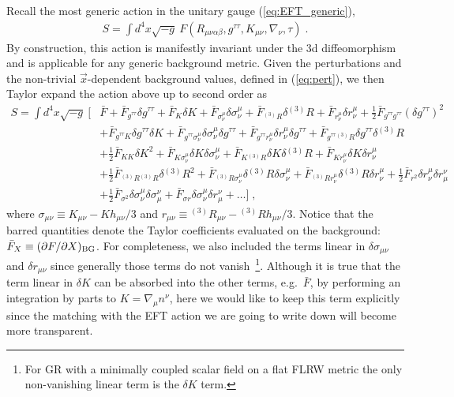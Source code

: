 \documentclass[a4paper,11pt]{article}
\numberwithin{equation}{section}
\begin{document}
Recall the most generic action in the unitary gauge (\ref{eq:EFT_generic}),
\begin{align}
S = \int d^4x \sqrt{-g}~F(R_{\mu\nu\alpha\beta},g^{\tau\tau},K_{\mu\nu},\nabla_\nu,\tau) \;.
\end{align}
By construction, this action is manifestly invariant under the 3d diffeomorphism and is applicable for any generic background metric. Given the perturbations and the non-trivial $\vec{x}$-dependent background values, defined in (\ref{eq:pert}), we then Taylor expand the action above up to second order as
\begin{align}\label{eq:EFT_taylor}
S = \int d^4x \sqrt{-g}~\bigg[&\bar{F} + \bar{F}_{g^{\tau\tau}} \delta g^{\tau\tau} + \bar{F}_{K}\delta K + \bar{F}_{\sigma^\mu_\nu}\delta \sigma^\mu_\nu + \bar{F}_{{}^{(3)}\!R}\delta {}^{(3)}\!R +  \bar{F}_{r^\mu_\nu}\delta r^\mu_\nu + \frac{1}{2}\bar{F}_{g^{\tau\tau}g^{\tau\tau}}(\delta g^{\tau\tau})^2 \nonumber \\  & + \bar{F}_{g^{\tau\tau}K} \delta g^{\tau\tau}\delta K + \bar{F}_{g^{\tau\tau} \sigma^\mu_\nu}\delta \sigma^\mu_\nu \delta g^{\tau\tau}  + \bar{F}_{g^{\tau\tau} r^\mu_\nu}\delta r^\mu_\nu \delta g^{\tau\tau} + \bar{F}_{g^{\tau\tau}{}^{(3)}\!R}\delta g^{\tau\tau} \delta {}^{(3)}\!R  \nonumber \\
&   + \frac{1}{2}\bar{F}_{KK} \delta K^2 + \bar{F}_{K \sigma^\mu_\nu}\delta K \delta \sigma^\mu_\nu + \bar{F}_{K{}^{(3)}\!R}\delta K \delta {}^{(3)}\!R + \bar{F}_{K r^\mu_\nu}\delta K \delta r^\mu_\nu    \nonumber \\ 
&  + \frac{1}{2} \bar{F}_{{}^{(3)}\!R{}^{(3)}\!R}\delta {}^{(3)}\!R^2   + \bar{F}_{{}^{(3)}\!R \sigma^\mu_\nu} \delta {}^{(3)}\!R \delta \sigma^\mu_\nu  +   \bar{F}_{{}^{(3)}\!R r^\mu_\nu}\delta {}^{(3)}\!R \delta r^\mu_\nu+\frac{1}{2}\bar{F}_{r^2 }\delta r^\mu_\nu \delta r^\nu_\mu   \nonumber \\
& + \frac{1}{2}\bar{F}_{\sigma^2} \delta \sigma^\mu_\nu \delta \sigma^\nu_\mu + \bar{F}_{\sigma r }\delta \sigma^\mu_\nu \delta r^\nu_\mu + \ldots  \bigg] \;,
\end{align}
where $\sigma_{\mu\nu} \equiv K_{\mu\nu} - K h_{\mu\nu}/3$ and $r_{\mu\nu} \equiv {}^{(3)}\!R_{\mu\nu} - {}^{(3)}\!R h_{\mu\nu}/3$. Notice that the barred quantities denote the Taylor coefficients evaluated on the background: $\bar{F}_X \equiv (\partial F/\partial X )_{\rm BG}$. For completeness, we also included the terms linear in $\delta \sigma_{\mu\nu}$ and $\delta r_{\mu\nu}$ since generally those terms do not vanish~\footnote{For GR with a minimally coupled scalar field on a flat FLRW metric the only non-vanishing linear term is the $\delta K$ term.}. Although it is true that the term linear in $\delta K$ can be absorbed into the other terms, e.g.~$\bar{F}$, by performing an integration by parts to $K = \nabla_\mu n^\nu$, here we would like to keep this term explicitly since the matching with the EFT action we are going to write down will become more transparent. 
\end{document}
